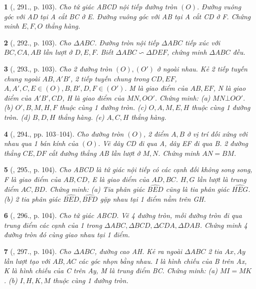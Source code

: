 \documentclass{article}
\newtheorem{baitoan}{}
\begin{document}
\begin{baitoan}[\cite{Binh_Toan_9_tap_2}, 291., p. 103]
	Cho tứ giác ABCD nội tiếp đường tròn $(O)$. Đường vuông góc với AD tại A cắt BC ở E. Đường vuông góc với AB tại A cắt CD ở F. Chứng minh $E,F,O$ thẳng hàng.
\end{baitoan}

\begin{baitoan}[\cite{Binh_Toan_9_tap_2}, 292., p. 103]
	Cho $\Delta ABC$. Đường tròn nội tiếp $\Delta ABC$ tiếp xúc với $BC,CA,AB$ lần lượt ở $D,E,F$. Biết $\Delta ABC\backsim\Delta DEF$, chứng minh $\Delta ABC$ đều.
\end{baitoan}

\begin{baitoan}[\cite{Binh_Toan_9_tap_2}, 293., p. 103]
	Cho 2 đường tròn $(O),(O')$ ở ngoài nhau. Kẻ 2 tiếp tuyến chung ngoài $AB,A'B'$, 2 tiếp tuyến chung trong $CD,EF$, $A,A',C,E\in(O),B,B',D,F\in(O')$. M là giao điểm của $AB,EF$, N là giao điểm của $A'B',CD$, H là giao điểm của $MN,OO'$. Chứng minh: (a) $MN\bot OO'$. (b) $O',B,M,H,F$ thuộc cùng 1 đường tròn. (c) $O,A,M,E,H$ thuộc cùng 1 đường tròn. (d) $B,D,H$ thẳng hàng. (e) $A,C,H$ thẳng hàng.
\end{baitoan}

\begin{baitoan}[\cite{Binh_Toan_9_tap_2}, 294., pp. 103--104]
	Cho đường tròn $(O)$, 2 điểm $A,B$ ở vị trí đối xứng với nhau qua 1 bán kính của $(O)$. Vẽ dây CD đi qua A, dây EF đi qua B. 2 đường thẳng $CE,DF$ cắt đường thẳng AB lần lượt ở $M,N$. Chứng minh $AN = BM$.
\end{baitoan}

\begin{baitoan}[\cite{Binh_Toan_9_tap_2}, 295., p. 104]
	Cho ABCD là tứ giác nội tiếp có các cạnh đối không song song, F là giao điểm của $AB,CD$, E là giao điểm của $AD,BC$. $H,G$ lần lượt là trung điểm $AC,BD$. Chứng minh: (a) Tia phân giác $\widehat{BED}$ cũng là tia phân giác $\widehat{HEG}$. (b) 2 tia phân giác $\widehat{BED},\widehat{BFD}$ gặp nhau tại 1 điểm nằm trên GH.
\end{baitoan}

\begin{baitoan}[\cite{Binh_Toan_9_tap_2}, 296., p. 104]
	Cho tứ giác ABCD. Vẽ 4 đường tròn, mỗi đường tròn đi qua trung điểm các cạnh của 1 trong $\Delta ABC,\Delta BCD,\Delta CDA,\Delta DAB$. Chứng minh 4 đường tròn đó cùng giao nhau tại 1 điểm.
\end{baitoan}

\begin{baitoan}[\cite{Binh_Toan_9_tap_2}, 297., p. 104]
	Cho $\Delta ABC$, đường cao AH. Kẻ ra ngoài $\Delta ABC$ 2 tia $Ax,Ay$ lần lượt tạo với $AB,AC$ các góc nhọn bằng nhau. I là hình chiếu của B trên Ax, K là hình chiếu của C trên Ay, M là trung điểm BC. Chứng minh: (a) $MI = MK$. (b) $I,H,K,M$ thuộc cùng 1 đường tròn.
\end{baitoan}
\end{document}
